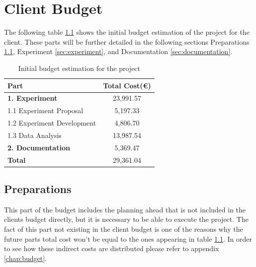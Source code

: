 \chapter{Client Budget}
\label{chap:client_budget}
The following table \ref{tab:initial_budget} shows the initial budget estimation of the project
for the client. These parts will be further detailed in the following sections Preparations \ref{sec:preparations},
 Experiment \ref{sec:experiment}, and Documentation \ref{sec:documentation}.
\begin{table}[H]
    \centering
    \begin{tabular}{|l|c|}
        \hline
        \textbf{Part} & \textbf{Total Cost(\euro)} \\
        \hline
        \textbf{1. Experiment} & 23,991.57 \\ \hline
        1.1 Experiment Proposal & 5,197.33  \\ \hline
        1.2 Experiment Development & 4,806.70 \\ \hline
        1.3 Data Analysis & 13,987.54  \\ \hline
        \textbf{2. Documentation} & 5,369.47 \\ \hline
        \textbf{Total} & 29,361.04 \\
        \hline
    \end{tabular}
    \caption{Initial budget estimation for the project}
    \label{tab:initial_budget}
\end{table}

\section{Preparations}
\label{sec:preparations}
This part of the budget includes the planning ahead that is not included in the clients budget directly,
but it is necessary to be able to execute the project. The fact of this part not existing in the client budget
is one of the reasons why the future parts total cost won't be equal to the ones appearing in table \ref{tab:initial_budget}.
In order to see how these indirect costs are distributed please refer to appendix \ref{chap:budget}.

